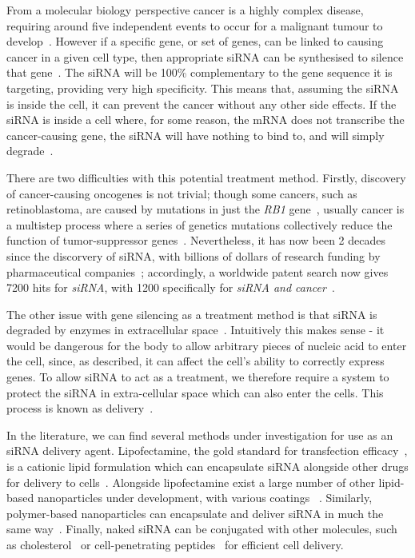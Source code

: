 From a molecular biology perspective cancer is a highly complex disease, requiring around five independent events to occur for a malignant tumour to develop~\cite[\textit{ch. 9}]{murray1993cell}. 
However if a specific gene, or set of genes, can be linked to causing cancer in a given cell type, then appropriate siRNA can be synthesised to silence that gene~\cite{dorsett2004sirnas}. 
The siRNA will be 100\% complementary to the gene sequence it is targeting, providing very high specificity. 
This means that, assuming the siRNA is inside the cell, it can prevent the cancer without any other side effects. 
If the siRNA is inside a cell where, for some reason, the mRNA does not transcribe the cancer-causing gene, the siRNA will have nothing to bind to, and will simply degrade~\cite{dorsett2004sirnas}.

There are two difficulties with this potential treatment method. 
Firstly, discovery of cancer-causing oncogenes is not trivial; though some cancers, such as retinoblastoma, are caused by mutations in just the \textit{RB1} gene~\cite{chial2008tumor}, usually cancer is a multistep process where a series of genetics mutations collectively reduce the function of tumor-suppressor genes~\cite[\textit{ch. 24}]{lodish1999molecular}\cite[\textit{ch. 9}]{murray1993cell}. 
Nevertheless, it has now been 2 decades since the discorvery of siRNA, with billions of dollars of research funding by pharmaceutical companies~\cite{chakraborty2017therapeutic}; accordingly, a worldwide patent search now gives \num{7200} hits for \textit{siRNA}, with \num{1200} specifically for \textit{siRNA and cancer}~\cite{sirnapatent}. 

The other issue with gene silencing as a treatment method is that siRNA is degraded by enzymes in extracellular space~\cite{dorsett2004sirnas}.
Intuitively this makes sense - it would be dangerous for the body to allow arbitrary pieces of nucleic acid to enter the cell, since, as described, it can affect the cell's ability to correctly express genes. 
To allow siRNA to act as a treatment, we therefore require a system to protect the siRNA in extra-cellular space which can also enter the cells. 
This process is known as delivery~\cite{tiwari2012drug}.

In the literature, we can find several methods under investigation for use as an siRNA delivery agent.
Lipofectamine, the gold standard for transfection efficacy~\cite{thermolipofectamine}, is a cationic lipid formulation which can encapsulate siRNA alongside other drugs for delivery to cells~\cite{liu2017efficient}. 
Alongside lipofectamine exist a large number of other lipid-based nanoparticles under development, with various coatings ~\cite{xu2015delivery}. %
Similarly, polymer-based nanoparticles can encapsulate and deliver siRNA in much the same way~\cite{sahoo2003nanotech, wang2009advances}. 
Finally, naked siRNA can be conjugated with other molecules, such as cholesterol~\cite{soutschek2004therapeutic} or cell-penetrating peptides~\cite{chiu2004visualizing} for efficient cell delivery. 

